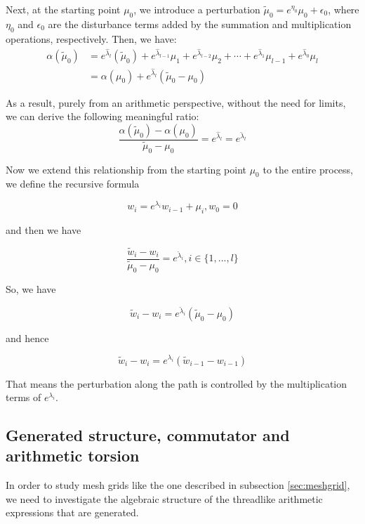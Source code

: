 Next, at the starting point $\mu_0$, we introduce a perturbation $\tilde{\mu}_0 = e^{\eta_0} \mu_0 + \epsilon_0$,
where $\eta_0$ and $\epsilon_0$ are the disturbance terms added by the summation and multiplication operations, respectively. Then, we have:
\begin{align}
\alpha(\tilde{\mu}_0) & = e^{\hat{\lambda}_l} (\tilde{\mu}_0) + e^{\hat{\lambda}_{l - 1}} \mu_1  + e^{\hat{\lambda}_{l - 2}} \mu_2 + \cdots + e^{\hat{\lambda}_1} \mu_{l - 1} + e^{\hat{\lambda}_0} \mu_l \\
& = \alpha(\mu_0) + e^{\hat{\lambda}_l} (\tilde{\mu}_0 - \mu_0)
\end{align}

As a result, purely from an arithmetic perspective, without the need for limits, we can derive the following meaningful ratio:
\begin{equation}
\frac{\alpha(\tilde{\mu}_0) - \alpha(\mu_0)}{\tilde{\mu}_0 - \mu_0} = e^{\hat{\lambda}_l} = e^{\check{\lambda}_l}
\end{equation}

Now we extend this relationship from the starting point $\mu_0$ to the entire process, we define the recursive formula

$$
w_i = e^{\lambda_i} w_{i-1} + \mu_i, w_0 = 0
$$

and then we have

\begin{equation}
\frac{\tilde{w}_i - w_i}{\tilde{\mu}_0 - \mu_0} = e^{\check{\lambda}_i}, i \in \{1, ..., l\}
\end{equation}

So, we have

$$
\tilde{w}_i - w_i = e^{\check{\lambda}_i} (\tilde{\mu}_0 - \mu_0)
$$

and hence

\begin{equation}
\tilde{w}_i - w_i = e^{\lambda_i}(\tilde{w}_{i - 1} - w_{i - 1})
\end{equation}

That means the perturbation along the path is controlled by the multiplication terms of $e^{\lambda_i}$.

\subsection{Generated structure, commutator and arithmetic torsion}

In order to study mesh grids like the one described in subsection \ref{sec:meshgrid},
we need to investigate the algebraic structure of the threadlike arithmetic expressions that are generated.

